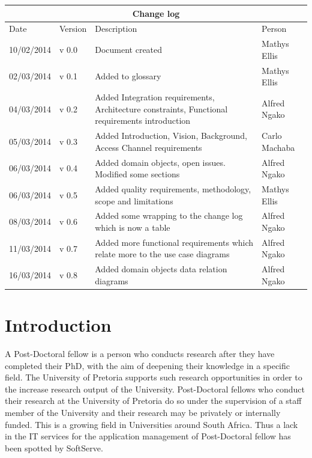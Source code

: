 \documentclass[12pt]{article}
\begin{document}
\begin{center}
\begin{tabular}{|l|p{1.4cm}|p{8cm}|p{2.8cm}|}
\hline
\multicolumn{4}{|c|}{\bf Change log} \\
\hline
 Date & Version & Description &  Person \\
\hline
10/02/2014 & v 0.0 & Document created & Mathys Ellis \\
\hline
02/03/2014 & v 0.1 & Added to glossary & Mathys Ellis \\
\hline
04/03/2014 & v 0.2 & Added Integration requirements, Architecture constraints, Functional requirements introduction & Alfred Ngako \\
\hline
05/03/2014 & v 0.3 & Added Introduction, Vision, Background, Access Channel requirements & Carlo Machaba \\
\hline
06/03/2014 & v 0.4 & Added domain objects, open issues. Modified some sections & Alfred Ngako \\
\hline
06/03/2014 & v 0.5 & Added quality requirements, methodology, scope and limitations & Mathys Ellis \\
\hline
08/03/2014 & v 0.6 & Added some wrapping to the change log which is now a table & Alfred Ngako \\
\hline
11/03/2014 & v 0.7 & Added more functional requirements which relate more to the use case diagrams & Alfred Ngako \\
\hline
16/03/2014 & v 0.8 & Added domain objects data relation diagrams & Alfred Ngako \\
\hline
\end{tabular}
\end{center}
\newpage
\tableofcontents

\listoffigures
\newpage
\section{Introduction} %
A Post-Doctoral fellow is a person who conducts research after they have completed their PhD, with the aim of deepening their knowledge in a specific field. The University of Pretoria supports such research opportunities in order to the increase research output of the University. Post-Doctoral fellows who conduct their research at the University of Pretoria do so under the supervision of a staff member of the University and their research may be privately or internally funded. This is a growing field in Universities around South Africa. Thus a lack in the IT services for the application management of Post-Doctoral fellow has been spotted by SoftServe.
\vspace{0.2in}
\end{document}
